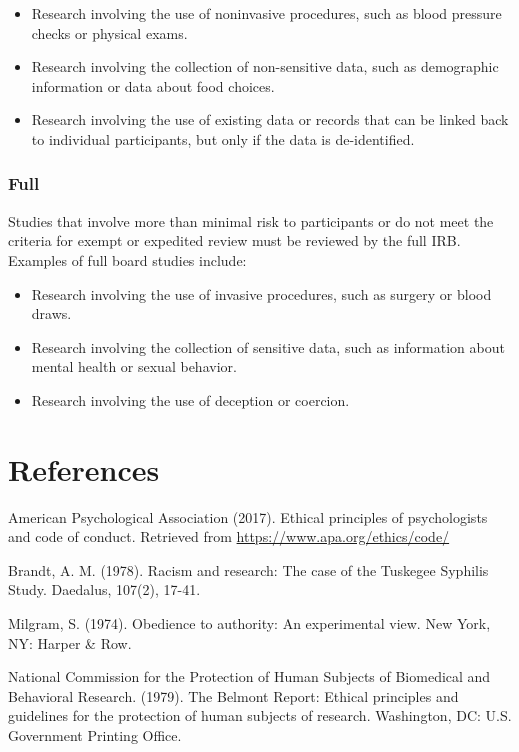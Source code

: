 \documentclass[
  b5paper]{book}
\begin{document}
\begin{itemize}
\item
  Research involving the use of noninvasive procedures, such as blood pressure checks or physical exams.
\item
  Research involving the collection of non-sensitive data, such as demographic information or data about food choices.
\item
  Research involving the use of existing data or records that can be linked back to individual participants, but only if the data is de-identified.
\end{itemize}

\hypertarget{full}{%
\subsubsection*{Full}\label{full}}

Studies that involve more than minimal risk to participants or do not meet the criteria for exempt or expedited review must be reviewed by the full IRB. Examples of full board studies include:

\begin{itemize}
\item
  Research involving the use of invasive procedures, such as surgery or blood draws.
\item
  Research involving the collection of sensitive data, such as information about mental health or sexual behavior.
\item
  Research involving the use of deception or coercion.
\end{itemize}

\hypertarget{references}{%
\section{References}\label{references}}

American Psychological Association (2017). Ethical principles of psychologists and code of conduct. Retrieved from \url{https://www.apa.org/ethics/code/}

Brandt, A. M. (1978). Racism and research: The case of the Tuskegee Syphilis Study. Daedalus, 107(2), 17-41.

Milgram, S. (1974). Obedience to authority: An experimental view. New York, NY: Harper \& Row.

National Commission for the Protection of Human Subjects of Biomedical and Behavioral Research. (1979). The Belmont Report: Ethical principles and guidelines for the protection of human subjects of research. Washington, DC: U.S. Government Printing Office.
\end{document}
